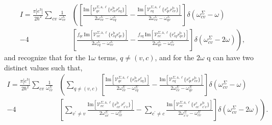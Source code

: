 \begin{align*}
I = \frac{\pi|e^3|}{2\hbar^2}\sum_{cv}\frac{1}{\omega^\Sigma_{cv}}
&\left(\left[
 \frac{\mathrm{Im}\left[\mathcal{V}^{\Sigma,\text{a},\ell}_{qc}
        \{r^{\text{b}}_{cv}
        r^{\text{c}}_{vq}\}\right]}
        {2\omega^\Sigma_{cv}-\omega^\Sigma_{cq}}
 -\frac{\mathrm{Im}\left[\mathcal{V}^{\Sigma,\text{a},\ell}_{vq}
        \{r^{\text{c}}_{qc}
        r^{\text{b}}_{cv}\}\right]}
        {2\omega^\Sigma_{cv}-\omega^\Sigma_{qv}}
\right]\delta(\omega^{\Sigma}_{cv}-\omega)\right.\nonumber\\
-
4&\left.\left[
  \frac{f_{qc}\,\mathrm{Im}\left[\mathcal{V}^{\Sigma,\text{a},\ell}_{vc}
        \{r^{\text{b}}_{cq}
        r^{\text{c}}_{qv}\}\right]}
        {2\omega^\Sigma_{cq}-\omega^\Sigma_{cv}}
 -\frac{f_{vq}\,\mathrm{Im}\left[\mathcal{V}^{\Sigma,\text{a},\ell}_{vc}
        \{r^{\text{c}}_{cq}
        r^{\text{b}}_{qv}\}\right]}
        {2\omega^\Sigma_{qv}-\omega^\Sigma_{cv}}
\right]\delta(\omega^{\Sigma}_{cv}-2\omega)\right)
,
\end{align*}
and recognize that for the $1\omega$ terms, $q\neq (v,c)$, and for the $2\omega$
q can have two distinct values such that,
\begin{align*}  
I = \frac{\pi|e^3|}{2\hbar^2}\sum_{cv}\frac{1}{\omega^\Sigma_{cv}}
&\left(
\sum_{q\neq (v,c)}
\left[
 \frac{\mathrm{Im}\left[\mathcal{V}^{\Sigma,\text{a},\ell}_{qc}
        \{r^{\text{b}}_{cv}
        r^{\text{c}}_{vq}\}\right]}
        {2\omega^\Sigma_{cv}-\omega^\Sigma_{cq}}
 -\frac{\mathrm{Im}\left[\mathcal{V}^{\Sigma,\text{a},\ell}_{vq}
        \{r^{\text{c}}_{qc}
        r^{\text{b}}_{cv}\}\right]}
        {2\omega^\Sigma_{cv}-\omega^\Sigma_{qv}}
\right]\delta(\omega^{\Sigma}_{cv}-\omega)\right.\nonumber\\
-
4&\left.\left[
 \sum_{v^{\prime}\neq v}
  \frac{\mathrm{Im}\left[\mathcal{V}^{\Sigma,\text{a},\ell}_{vc}
        \{r^{\text{b}}_{cv^{\prime}}
        r^{\text{c}}_{v^{\prime}v}\}\right]}
        {2\omega^\Sigma_{cv^{\prime}}-\omega^\Sigma_{cv}}
 -\sum_{c^{\prime}\neq c}
 \frac{\mathrm{Im}\left[\mathcal{V}^{\Sigma,\text{a},\ell}_{vc}
        \{r^{\text{c}}_{cc^{\prime}}
        r^{\text{b}}_{c^{\prime}v}\}\right]}
        {2\omega^\Sigma_{c^{\prime}v}-\omega^\Sigma_{cv}}
\right]\delta(\omega^{\Sigma}_{cv}-2\omega)\right).
\end{align*}



